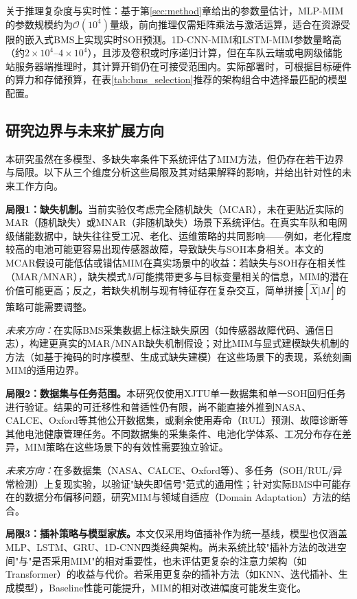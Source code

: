 \documentclass[10pt,a4paper]{ctexart}
\begin{document}
关于推理复杂度与实时性：基于第\ref{sec:method}章给出的参数量估计，MLP-MIM的参数规模约为$\mathcal{O}(10^4)$量级，前向推理仅需矩阵乘法与激活运算，适合在资源受限的嵌入式BMS上实现实时SOH预测。1D-CNN-MIM和LSTM-MIM参数量略高（约$2\times10^4$--$4\times10^4$），且涉及卷积或时序递归计算，但在车队云端或电网级储能站服务器端推理时，其计算开销仍在可接受范围内。实际部署时，可根据目标硬件的算力和存储预算，在表\ref{tab:bms_selection}推荐的架构组合中选择最匹配的模型配置。

\subsection{研究边界与未来扩展方向}

本研究虽然在多模型、多缺失率条件下系统评估了MIM方法，但仍存在若干边界与局限。以下从三个维度分析这些局限及其对结果解释的影响，并给出针对性的未来工作方向。

\textbf{局限1：缺失机制。}当前实验仅考虑完全随机缺失（MCAR），未在更贴近实际的MAR（随机缺失）或MNAR（非随机缺失）场景下系统评估。在真实车队和电网级储能数据中，缺失往往受工况、老化、运维策略的共同影响——例如，老化程度较高的电池可能更容易出现传感器故障，导致缺失与SOH本身相关。本文的MCAR假设可能低估或错估MIM在真实场景中的收益：若缺失与SOH存在相关性（MAR/MNAR），缺失模式$M$可能携带更多与目标变量相关的信息，MIM的潜在价值可能更高；反之，若缺失机制与现有特征存在复杂交互，简单拼接$[\hat{X}|M]$的策略可能需要调整。

\textit{未来方向：}在实际BMS采集数据上标注缺失原因（如传感器故障代码、通信日志），构建更真实的MAR/MNAR缺失机制假设；对比MIM与显式建模缺失机制的方法（如基于掩码的时序模型、生成式缺失建模）在这些场景下的表现，系统刻画MIM的适用边界。

\textbf{局限2：数据集与任务范围。}本研究仅使用XJTU单一数据集和单一SOH回归任务进行验证。结果的可迁移性和普适性仍有限，尚不能直接外推到NASA、CALCE、Oxford等其他公开数据集，或剩余使用寿命（RUL）预测、故障诊断等其他电池健康管理任务。不同数据集的采集条件、电池化学体系、工况分布存在差异，MIM策略在这些场景下的有效性需要独立验证。

\textit{未来方向：}在多数据集（NASA、CALCE、Oxford等）、多任务（SOH/RUL/异常检测）上复现实验，以验证"缺失即信号"范式的通用性；针对实际BMS中可能存在的数据分布偏移问题，研究MIM与领域自适应（Domain Adaptation）方法的结合。

\textbf{局限3：插补策略与模型家族。}本文仅采用均值插补作为统一基线，模型也仅涵盖MLP、LSTM、GRU、1D-CNN四类经典架构。尚未系统比较"插补方法的改进空间"与"是否采用MIM"的相对重要性，也未评估更复杂的注意力架构（如Transformer）的收益与代价。若采用更复杂的插补方法（如KNN、迭代插补、生成模型），Baseline性能可能提升，MIM的相对改进幅度可能发生变化。
\end{document}
